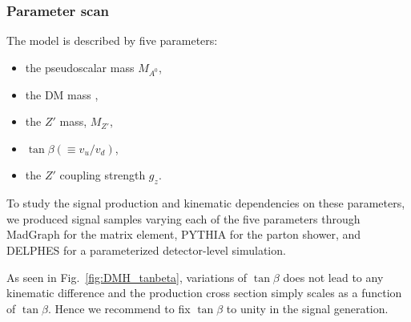  
\subsubsection{Parameter scan}
 
 The model is described by five parameters:
 \begin{itemize}
 	\item the pseudoscalar mass $M_{A^0}$,
 	\item the DM mass \mdm, 	 
 	\item the $Z'$ mass, $M_{Z'}$,
    \item $\tan{\beta} (\equiv v_u/v_d)$,
 	\item the $Z'$ coupling strength $g_z$. 
 \end{itemize}

 To study the signal production and kinematic dependencies on these parameters, 
 we produced signal samples varying each of the five parameters through 
 MadGraph for the matrix element, PYTHIA for the parton shower, and DELPHES\cite{deFavereau:2013fsa} 
for a parameterized detector-level simulation.
 
 As seen in Fig.~\ref{fig:DMH_tanbeta}, variations of $\tan{\beta}$ does not lead to any kinematic 
 difference and the production cross section simply scales as a function of $\tan{\beta}$. Hence 
we recommend to fix $\tan{\beta}$ to unity in the signal generation. 


